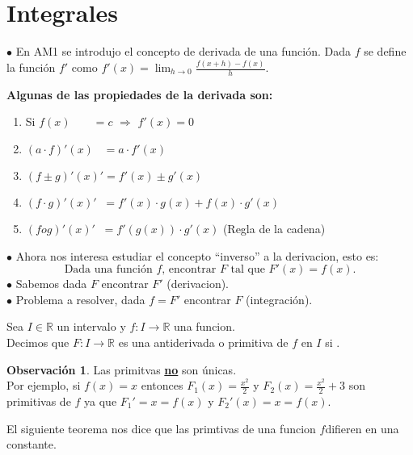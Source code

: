 \documentclass{article}
\theoremstyle{definition}
\newtheorem*{obs}{Observación}
\theoremstyle{remark}
\newcommand\R{\ensuremath{\mathbb{R}}}
\newcommand\fun{$f$\;}
\begin{document}
\tableofcontents

\section{Integrales}
$ \bullet $ En AM1 se introdujo el concepto de derivada de una función. Dada $f$ se define la función $f'$ como $f'(x)=\lim_{h\to0}\frac{f(x+h)-f(x)}{h}$.

\begin{center}
\textbf{Algunas de las propiedades de la derivada son:}
\end{center}

\begin{enumerate}
  \item Si $f(x)\;\;\;\;\;\;\;=c$ \; \quad $\Rightarrow$ \quad \; $f'(x)=0$
  \item $(a \cdot f)'(x) \;\;\;= a\cdot f'(x) $
  \item $(f\pm g)'(x)'   = f'(x)\pm g'(x)$
  \item $(f\cdot g)'(x)' \;\;=f'(x)\cdot g(x)+f(x)\cdot g'(x)$
  \item $(fog)'(x)'      \;\;=f'(g(x))\cdot g'(x)$ \quad \quad (Regla de la cadena)
\end{enumerate}

$\bullet$ Ahora nos interesa estudiar el concepto ``inverso'' a la derivacion, esto es:
\[\boxed{\text{Dada una función $f$, encontrar $F$ tal que $F'(x)=f(x)$.}}\]
$\bullet$ Sabemos dada $F$ encontrar $F'$ (derivacion). \\
$\bullet$ Problema a resolver, dada $f=F'$ encontrar $F$ (integración).

\begin{defi}
  Sea $I \in \R$ un intervalo y $f : I \to \R $ una funcion. \\
  Decimos que $F : I \to \R $ es una antiderivada o primitiva de $f$ en $I$ si
  .
\end{defi}

\begin{obs}
  Las primitvas \underline{\textbf{no}} son únicas. \\
  Por ejemplo, si $f(x)=x$ entonces $F_1(x)=\frac{x^2}{2}$ y $F_2(x)=\frac{x^2}{2}+3$ son primitivas de $f$ ya que $F_1'=x=f(x)$ y $F_2'(x)=x=f(x)$.
\end{obs}

El siguiente teorema nos dice que las primtivas de una funcion \fun difieren en una constante.
\end{document}
